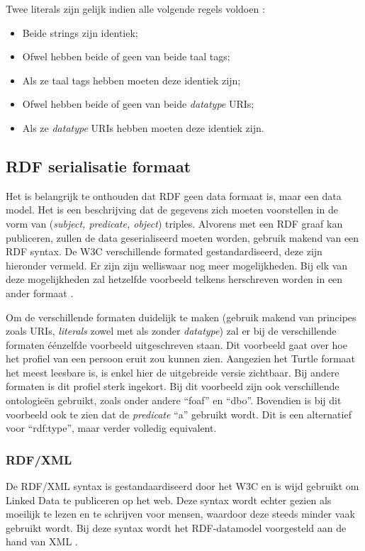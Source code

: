 Twee literals zijn gelijk indien alle volgende regels voldoen \cite{klyne2009resource}:
\begin{itemize}
    \item Beide strings zijn identiek;
    \item Ofwel hebben beide of geen van beide taal tags;
    \item Als ze taal tags hebben moeten deze identiek zijn;
    \item Ofwel hebben beide of geen van beide \textit{datatype} URIs;
    \item Als ze \textit{datatype} URIs hebben moeten deze identiek zijn.
\end{itemize}

\subsection{RDF serialisatie formaat}
\label{subsec:rdf_format}
Het is belangrijk te onthouden dat RDF geen data formaat is, maar een data model. Het is een beschrijving dat de gegevens zich moeten voorstellen in de vorm van (\textit{subject, predicate, object}) triples. Alvorens met een RDF graaf kan publiceren, zullen de data geserialiseerd moeten worden, gebruik makend van een RDF syntax. De W3C verschillende formated gestandardiseerd, deze zijn hieronder vermeld. Er zijn zijn welliswaar nog meer mogelijkheden. Bij elk van deze mogelijkheden zal hetzelfde voorbeeld telkens herschreven worden in een ander formaat \cite{heath2011linked}.

Om de verschillende formaten duidelijk te maken (gebruik makend van principes zoals URIs, \textit{literals} zowel met als zonder \textit{datatype}) zal er bij de verschillende formaten éénzelfde voorbeeld uitgeschreven staan. Dit voorbeeld gaat over hoe het profiel van een persoon eruit zou kunnen zien. Aangezien het Turtle formaat het meest leesbare is, is enkel hier de uitgebreide versie zichtbaar. Bij andere formaten is dit profiel sterk ingekort. Bij dit voorbeeld zijn ook verschillende ontologieën gebruikt, zoals onder andere ``foaf'' en ``dbo''. Bovendien is bij dit voorbeeld ook te zien dat de \textit{predicate} ``a'' gebruikt wordt. Dit is een alternatief voor ``rdf:type'', maar verder volledig equivalent.

\subsubsection{RDF/XML}
De RDF/XML syntax is gestandaardiseerd door het W3C en is wijd gebruikt om Linked Data te publiceren op het web. Deze syntax wordt echter gezien als moeilijk te lezen en te schrijven voor mensen, waardoor deze steeds minder vaak gebruikt wordt. Bij deze syntax wordt het RDF-datamodel voorgesteld aan de hand van XML \cite{manola2004rdf}.

